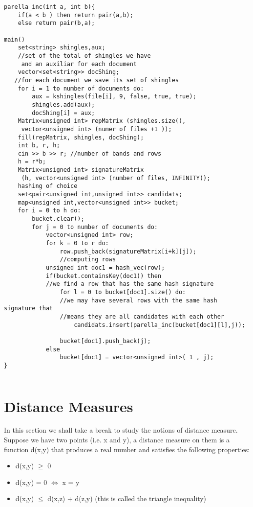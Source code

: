 \documentclass[12pt]{article}
\begin{document}
\begin{lstlisting}
parella_inc(int a, int b){
	if(a < b ) then return pair(a,b);
	else return pair(b,a);

main()
    set<string> shingles,aux;	
    //set of the total of shingles we have
     and an auxiliar for each document
    vector<set<string>> docShing; 
   //for each document we save its set of shingles
    for i = 1 to number of documents do:
        aux = kshingles(file[i], 9, false, true, true);
        shingles.add(aux);
        docShing[i] = aux;
    Matrix<unsigned int> repMatrix (shingles.size(),
     vector<unsigned int> (numer of files +1 ));
    fill(repMatrix, shingles, docShing);
    int b, r, h;
    cin >> b >> r; //number of bands and rows
    h = r*b;
    Matrix<unsigned int> signatureMatrix
     (h, vector<unsigned int> (number of files, INFINITY));
    hashing of choice
    set<pair<unsigned int,unsigned int>> candidats;                     
    map<unsigned int,vector<unsigned int>> bucket;
    for i = 0 to h do:
        bucket.clear();
        for j = 0 to number of documents do:
            vector<unsigned int> row;
            for k = 0 to r do:
                row.push_back(signatureMatrix[i+k][j]);
                //computing rows
            unsigned int doc1 = hash_vec(row);
			if(bucket.containsKey(doc1)) then
			//we find a row that has the same hash signature
				for l = 0 to bucket[doc1].size() do: 
				//we may have several rows with the same hash signature that 
				//means they are all candidates with each other
					candidats.insert(parella_inc(bucket[doc1][l],j));
				           
            	bucket[doc1].push_back(j);
            else 
            	bucket[doc1] = vector<unsigned int>( 1 , j);
}
 
 \end{lstlisting}
 
\section{Distance Measures}

In this section we shall take a break to study the notions of distance measure.
Suppose we have two points (i.e. x and y), a distance measure on them is a function d(x,y) that produces a real number and satisfies the following properties:
\begin{itemize}
\item d(x,y) $\geq$ 0 

\item d(x,y) = 0 $\iff$ x = y 

\item d(x,y) $\leq$ d(x,z) + d(z,y) (this is called the triangle inequality)
\end{itemize}
\end{document}
